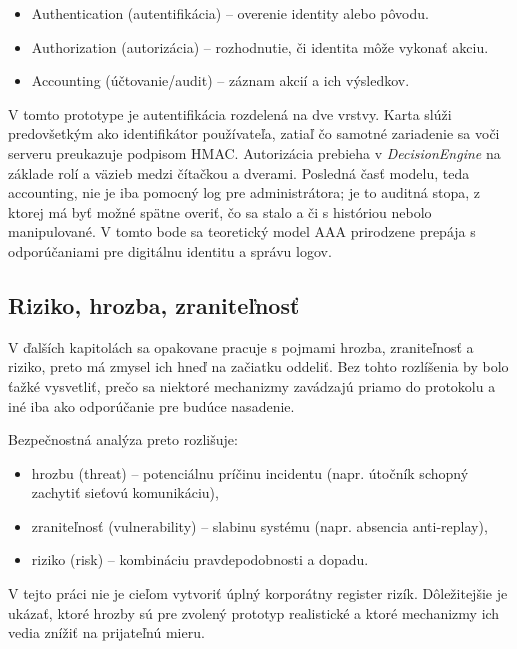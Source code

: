\documentclass[journal,a4paper,onecolumn]{IEEEtran}
\begin{document}
\begin{itemize}[leftmargin=*,itemsep=2pt]
  \item Authentication (autentifikácia) -- overenie identity alebo pôvodu.
  \item Authorization (autorizácia) -- rozhodnutie, či identita môže vykonať akciu.
  \item Accounting (účtovanie/audit) -- záznam akcií a ich výsledkov.
\end{itemize}

V tomto prototype je autentifikácia rozdelená na dve vrstvy. Karta slúži predovšetkým ako identifikátor používateľa, zatiaľ čo samotné zariadenie sa voči serveru preukazuje podpisom HMAC. Autorizácia prebieha v \emph{DecisionEngine} na základe rolí a väzieb medzi čítačkou a dverami. Posledná časť modelu, teda accounting, nie je iba pomocný log pre administrátora; je to auditná stopa, z ktorej má byť možné spätne overiť, čo sa stalo a či s históriou nebolo manipulované. V tomto bode sa teoretický model AAA prirodzene prepája s odporúčaniami pre digitálnu identitu a správu logov.\cite{NIST80063B4,NIST80092}

\subsection{Riziko, hrozba, zraniteľnosť}

V ďalších kapitolách sa opakovane pracuje s pojmami hrozba, zraniteľnosť a riziko, preto má zmysel ich hneď na začiatku oddeliť. Bez tohto rozlíšenia by bolo ťažké vysvetliť, prečo sa niektoré mechanizmy zavádzajú priamo do protokolu a iné iba ako odporúčanie pre budúce nasadenie.

Bezpečnostná analýza preto rozlišuje:

\begin{itemize}[leftmargin=*,itemsep=2pt]
  \item hrozbu (threat) -- potenciálnu príčinu incidentu (napr. útočník schopný zachytiť sieťovú komunikáciu),
  \item zraniteľnosť (vulnerability) -- slabinu systému (napr. absencia anti-replay),
  \item riziko (risk) -- kombináciu pravdepodobnosti a dopadu.
\end{itemize}

V tejto práci nie je cieľom vytvoriť úplný korporátny register rizík. Dôležitejšie je ukázať, ktoré hrozby sú pre zvolený prototyp realistické a ktoré mechanizmy ich vedia znížiť na prijateľnú mieru.
\end{document}
